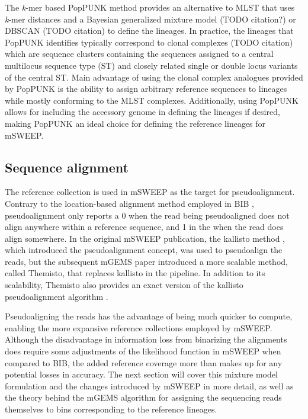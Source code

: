 \documentclass[officiallayout]{tktla}
\begin{document}
The \textit{k}-mer based PopPUNK method \citep{lees2019fast} provides
an alternative to MLST that uses \textit{k}-mer distances and a
Bayesian generalized mixture model (TODO citation?) or DBSCAN (TODO
citation) to define the lineages. In practice, the lineages that
PopPUNK identifies typically correspond to clonal complexes (TODO
citation) which are sequence clusters containing the sequences
assigned to a central multilocus sequence type (ST) and closely
related single or double locus variants of the central ST. Main
advantage of using the clonal complex analogues provided by PopPUNK is
the ability to assign arbitrary reference sequences to lineages while
mostly conforming to the MLST complexes. Additionally, using PopPUNK
allows for including the accessory genome in defining the lineages if
desired, making PopPUNK an ideal choice for defining the reference
lineages for mSWEEP.

\subsection{Sequence alignment}
\label{section:sequence-alignment}

The reference collection is used in mSWEEP as the target for
pseudoalignment. Contrary to the location-based alignment method
employed in BIB \citep{sankar2016bayesian}, pseudoalignment only
reports a 0 when the read being pseudoaligned does not align anywhere
within a reference sequence, and 1 in the when the read does align
somewhere. In the original mSWEEP publication, the kallisto method
\citep{bray2016near}, which introduced the pseudoalignment concept,
was used to pseudoalign the reads, but the subsequent mGEMS paper
introduced a more scalable method, called Themisto, that replaces
kallisto in the pipeline. In addition to its scalability, Themisto
also provides an exact version of the kallisto pseudoalignment
algorithm \citep{maklin_bacterial_2021}.

Pseudoaligning the reads has the advantage of being much quicker to
compute, enabling the more expansive reference collections employed by
mSWEEP. Although the disadvantage in information loss from binarizing
the alignments does require some adjustments of the likelihood
function in mSWEEP when compared to BIB, the added reference coverage
more than makes up for any potential losses in accuracy. The next
section will cover this mixture model formulation and the changes
introduced by mSWEEP in more detail, as well as the theory behind the
mGEMS algorithm for assigning the sequencing reads themselves to bins
corresponding to the reference lineages.
\end{document}
